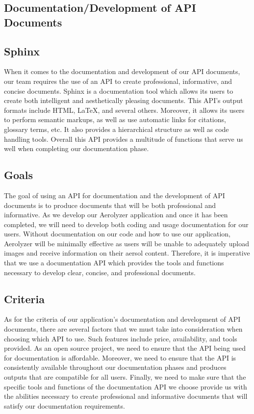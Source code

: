 \documentclass[onecolumn, draftclsnofoot,10pt, compsoc]{IEEEtran}
\begin{document}
\begin{flushleft}
\section{Documentation/Development of API Documents}
\subsection{Sphinx}
When it comes to the documentation and development of our API documents, our team requires the use of an API to create professional, informative, and concise documents. Sphinx is a documentation tool which allows its users to create both intelligent and aesthetically pleasing documents. This API's output formats include HTML, LaTeX, and several others. Moreover, it allows its users to perform semantic markups, as well as use automatic links for citations, glossary terms, etc. It also provides a hierarchical structure as well as code handling tools. Overall this API provides a multitude of functions that serve us well when completing our documentation phase.
\subsection{Goals}
The goal of using an API for documentation and the development of API documents is to produce documents that will be both professional and informative. As we develop our Aerolyzer application and once it has been completed, we will need to develop both coding and usage documentation for our users. Without documentation on our code and how to use our application, Aerolyzer will be minimally effective as users will be unable to adequately upload images and receive information on their aersol content. Therefore, it is imperative that we use a documentation API which provides the tools and functions necessary to develop clear, concise, and professional documents.
\subsection{Criteria}
As for the criteria of our application's documentation and development of API documents, there are several factors that we must take into consideration when choosing which API to use. Such features include price, availability, and tools provided. As an open source project, we need to ensure that the API being used for documentation is affordable. Moreover, we need to ensure that the API is consistently available throughout our documentation phases and produces outputs that are compatible for all users. Finally, we need to make sure that the specific tools and functions of the documentation API we choose provide us with the abilities necessary to create professional and informative documents that will satisfy our documentation requirements.

\end{flushleft}
\end{document}
